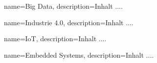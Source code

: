 \makeglossaries




{
	name=Big Data,
	description={Inhalt ....}
}


{
	name=Industrie 4.0,
	description={Inhalt ....}
}


{
	name=IoT,
	description={Inhalt ....}
}


{
	name=Embedded Systems,
	description={Inhalt ....}
}





